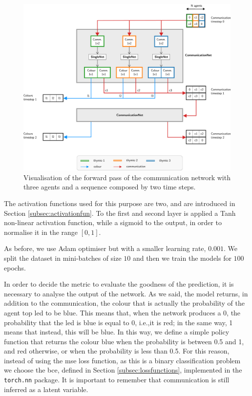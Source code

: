 \begin{figure}[!htb]
	\centering
	\includegraphics[width=\textwidth]{contents/images/commnettask2}
	\caption[Communication network of the second task.]{Visualisation of the 
		forward pass of the communication network with three agents and a 
		sequence 
		composed by two time steps.}
	\label{fig:commnet2}
\end{figure}

The activation functions used for this purpose are two, and are introduced in 
Section \ref{subsec:activationfun}.
To the first and second layer is applied a Tanh non-linear activation function, 
while a sigmoid to the output, in order to normalise it in the range $[0, 1]$.

As before, we use Adam optimiser but with a smaller learning rate, $0.001$. 
We split the dataset in mini-batches of size $10$ and then we train the models for 
$100$ epochs. 

In order to decide the metric to evaluate the goodness of the prediction, it is 
necessary to analyse the output of the network. As we said, the model returns, in 
addition to the communication, the colour that is actually the probability of the 
agent top \gls{led} to be blue. This means that, when the network produces a 0, 
the probability that the \gls{led} is blue is equal to 0, i.e.,it is red; in the same way, 
1 means that instead, this will be blue. In this way, we define a simple policy 
function that returns the colour blue when the probability is between 0.5 and 1, 
and red otherwise, or when the probability is less than 0.5.
For this reason, instead of using the \gls{mse} loss function, as this is a binary 
classification problem we choose the \gls{bce}, defined in Section 
\ref{subsec:lossfunctions}, implemented in the \texttt{torch.nn} package.
It is important to remember that communication is still inferred as a latent 
variable.
